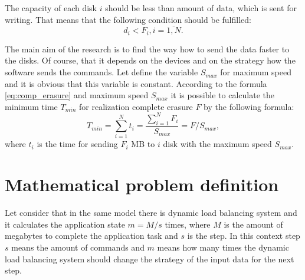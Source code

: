 The capacity of each disk $i$ should be less than amount of data, which is sent for writing. That means that the following condition should be fulfilled:
\begin{equation}
	d_i < F_i, i=\overline{1,N}.
\end{equation}

The main aim of the research is to find the way how to send the data faster to the disks. Of course, that it depends on the devices and on the strategy how the software sends the commands. Let define the variable $S_{max}$ for maximum speed and it is obvious that this variable is constant. According to the formula \ref{eq:comp_erasure} and maximum speed $S_{max}$ it is possible to calculate the minimum time $T_{min}$ for realization complete erasure $F$ by the following formula:
\begin{equation}
\label{eq:time_min}
	T_{min} = \sum_{i=1}^{N}t_i 
			= \frac{\sum_{i=1}^{N}F_i}{S_{max}}
			= F/S_{max},
\end{equation}
where $t_i$ is the time for sending $F_i$ MB to $i$ disk with the maximum speed $S_{max}$. 



\section{Mathematical problem definition}
Let consider that in the same model there is dynamic load balancing system and it calculates the application state $m=M/s$ times, where $M$ is the amount of megabytes to complete the application task and $s$ is the step. In this context step $s$ means the amount of commands and $m$ means how many times the dynamic load balancing system should change the strategy of the input data for the next step.

